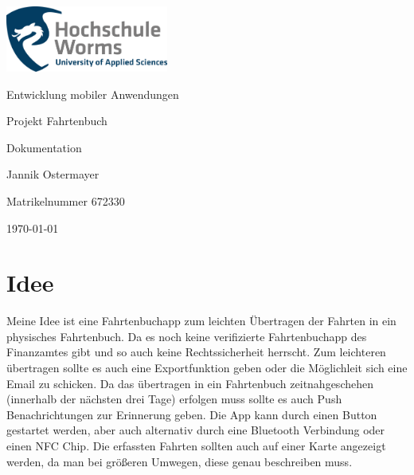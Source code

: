 \documentclass[a4paper]{article}
\author{Jannik Ostermayer}
\begin{document}
\pagestyle{scrheadings}         %
\clearpairofpagestyles          %
\ofoot{\pagemark}

\begin{titlepage}

	\centering
	\includegraphics[width=0.4\textwidth]{img/Logo_HS_Worms.png}\par\vspace{1cm}
	{\LARGE Entwicklung mobiler Anwendungen \par}
	\vspace{1.5cm}
	{\huge Projekt Fahrtenbuch\par}
	\vspace{0.3cm}
	{\huge Dokumentation\par}
	\vspace{2cm}
	{\Large Jannik Ostermayer\par}
	\vspace{1cm}
	{ Matrikelnummer 672330 \par}
	\vfill

	{\large \today\par}

\end{titlepage}
\pagebreak
\tableofcontents    %
\pagebreak          %

\section{Idee}
Meine Idee ist eine Fahrtenbuchapp zum leichten Übertragen 
der Fahrten in ein physisches Fahrtenbuch.
Da es noch keine verifizierte Fahrtenbuchapp 
des Finanzamtes gibt und so auch keine Rechtssicherheit herrscht.
Zum leichteren übertragen sollte es auch eine Exportfunktion geben oder
die Möglichleit sich eine Email zu schicken.
Da das übertragen in ein Fahrtenbuch zeitnahgeschehen (innerhalb der 
nächsten drei Tage) erfolgen muss sollte es auch Push Benachrichtungen
zur Erinnerung geben. Die App kann durch einen Button gestartet werden,
aber auch alternativ durch eine Bluetooth Verbindung oder einen NFC Chip.
Die erfassten Fahrten sollten auch auf einer Karte angezeigt werden,
da man bei größeren Umwegen, diese genau beschreiben muss.
\end{document}
